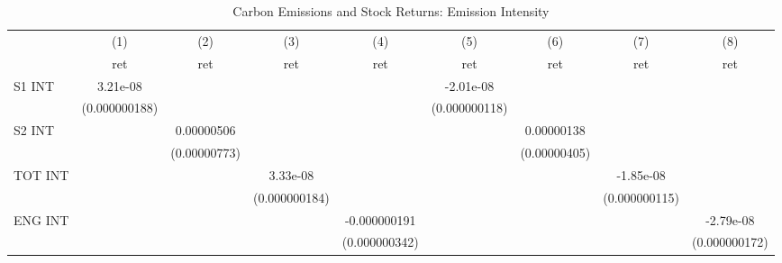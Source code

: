 \begin{table}[htbp]\centering
\def\sym#1{\ifmmode^{#1}\else\(^{#1}\)\fi}
\caption{Carbon Emissions and Stock Returns: Emission Intensity}
\begin{tabular}{l*{8}{c}}
\hline\hline
                    &\multicolumn{1}{c}{(1)}&\multicolumn{1}{c}{(2)}&\multicolumn{1}{c}{(3)}&\multicolumn{1}{c}{(4)}&\multicolumn{1}{c}{(5)}&\multicolumn{1}{c}{(6)}&\multicolumn{1}{c}{(7)}&\multicolumn{1}{c}{(8)}\\
                    &\multicolumn{1}{c}{ret}&\multicolumn{1}{c}{ret}&\multicolumn{1}{c}{ret}&\multicolumn{1}{c}{ret}&\multicolumn{1}{c}{ret}&\multicolumn{1}{c}{ret}&\multicolumn{1}{c}{ret}&\multicolumn{1}{c}{ret}\\
\hline
S1 INT              &    3.21e-08         &                     &                     &                     &   -2.01e-08         &                     &                     &                     \\
                    &(0.000000188)         &                     &                     &                     &(0.000000118)         &                     &                     &                     \\
S2 INT              &                     &  0.00000506         &                     &                     &                     &  0.00000138         &                     &                     \\
                    &                     &(0.00000773)         &                     &                     &                     &(0.00000405)         &                     &                     \\
TOT INT             &                     &                     &    3.33e-08         &                     &                     &                     &   -1.85e-08         &                     \\
                    &                     &                     &(0.000000184)         &                     &                     &                     &(0.000000115)         &                     \\
ENG INT             &                     &                     &                     &-0.000000191         &                     &                     &                     &   -2.79e-08         \\
                    &                     &                     &                     &(0.000000342)         &                     &                     &                     &(0.000000172)         \\

\end{tabular}
\end{table}
